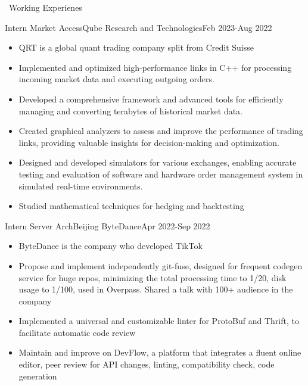 \documentclass{resume}
\begin{document}
\begin{rSection}{\faUsers~Working Experienes}
    \begin{rExperience}{Intern Market Access}{Qube Research and Technologies}{Feb 2023-Aug 2022}
        \begin{itemize}
            \itemsep -0.5em \vspace{-0.5em}
            \item QRT is a global quant trading company split from Credit Suisse
            \item Implemented and optimized high-performance links in C++ for processing incoming market data and executing outgoing orders.
            \item Developed a comprehensive framework and advanced tools for efficiently managing and converting terabytes of historical market data.
            \item Created graphical analyzers to assess and improve the performance of trading links, providing valuable insights for decision-making and optimization.
            \item Designed and developed simulators for various exchanges, enabling accurate testing and evaluation of software and hardware order management system in simulated real-time environments.
            \item Studied mathematical techniques for hedging and backtesting
        \end{itemize}
    \end{rExperience}
    \begin{rExperience}{Intern Server Arch}{Beijing ByteDance}{Apr 2022-Sep 2022}
        \begin{itemize}
            \itemsep -0.5em \vspace{-0.5em}
            \item ByteDance is the company who developed TikTok
            \item Propose and implement independently git-fuse, designed for frequent codegen service for huge repos, minimizing the total processing time to 1/20, disk usage to 1/100, used in Overpass. Shared a talk with 100+ audience in the company
            \item Implemented a universal and customizable linter for ProtoBuf and Thrift, to facilitate automatic code review
            \item Maintain and improve on DevFlow, a platform that integrates a fluent online editor, peer review for API changes, linting, compatibility check, code generation

\end{itemize}
\end{rExperience}
\end{rSection}
\end{document}
